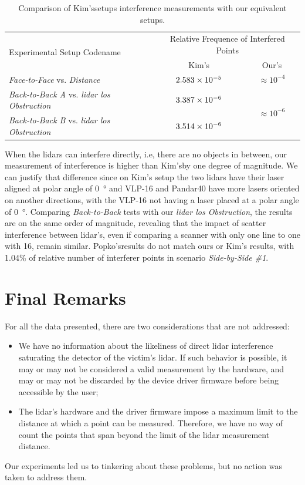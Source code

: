 \begin{table}[!ht]
	\vspace{6mm}
	\centering
	\renewcommand{\arraystretch}{1.3}
	\begin{tabular}{@{}p{7.5cm}cc@{}}
			\toprule
			\multirow{2}{*}{Experimental Setup Codename} & \multicolumn{2}{c}{Relative Frequence of Interfered Points} \\ \cmidrule{2-3}
																									 & Kim's\etal & Our's\\
			\midrule
			\textit{Face-to-Face} vs. \textit{Distance}   & $2.583\times 10^{-5}$  & $\approx 10^{-4}$ \\ \midrule
			\textit{Back-to-Back A} vs. \textit{\ac{lidar} \ac{los} Obstruction}  & $3.387\times 10^{-6}$ & \multirow{2}{*}{$\approx 10^{-6}$} \\
			\textit{Back-to-Back B} vs. \textit{\ac{lidar} \ac{los} Obstruction} & $3.514\times 10^{-6}$ & \\ \bottomrule
		\end{tabular}
		\caption[Comparison of Kim's\etal interferference with our results for equivalent setups.]{Comparison of Kim's\etal setups interference measurements with our equivalent setups.}
		\label{tab:kim-vs-ours-comparison}
\end{table}

When the \acp{lidar} can interfere directly, i.e, there are no objects in between, our measurement of interference is higher than Kim's\etal by one degree of magnitude. We can justify that difference since on Kim's setup the two \acp{lidar} have their laser aligned at polar angle of \SI{0}{\degree} and VLP-16 and Pandar40 have more lasers oriented on another directions, with the VLP-16 not having a laser placed at a polar angle of \SI{0}{\degree}. Comparing \textit{Back-to-Back} tests with our \textit{\ac{lidar} \ac{los} Obstruction}, the results are on the same order of magnitude, revealing that the impact of scatter interference between \ac{lidar}'s, even if comparing a scanner with only one line to one with 16, remain similar. Popko's\etal results do not match ours or Kim's results, with 1.04\% of relative number of interferer points in scenario \textit{Side-by-Side \#1}.

\section{Final Remarks}
For all the data presented, there are two considerations that are not addressed:

\begin{itemize}
	\item We have no information about the likeliness of direct \ac{lidar} interference saturating the detector of the victim's \ac{lidar}. If such behavior is possible, it may or may not be considered a valid measurement by the hardware, and may or may not be discarded by the device driver firmware before being accessible by the user;
	\item The \ac{lidar}'s hardware and the driver firmware impose a maximum limit to the distance at which a point can be measured. Therefore, we have no way of count the points that span beyond the limit of the \ac{lidar} measurement distance. 
\end{itemize}

Our experiments led us to tinkering about these problems, but no action was taken to address them.
